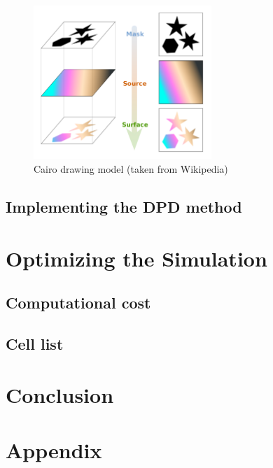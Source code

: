 \documentclass[]{usiinfbachelorproject}
\begin{document}
\begin{figure} [h]
    \centering
    \includegraphics[width=0.6\textwidth]{cairo_model.png}
    \caption{Cairo drawing model (taken from Wikipedia)}
    \label{fig:CairoModel}
\end{figure}

\newpage

\subsection{Implementing the DPD method}

\newpage
\section{Optimizing the Simulation}
\subsection{Computational cost}
\subsection{Cell list}

\newpage
\section{Conclusion}

\newpage
\section{Appendix}

\newpage


\end{document}
